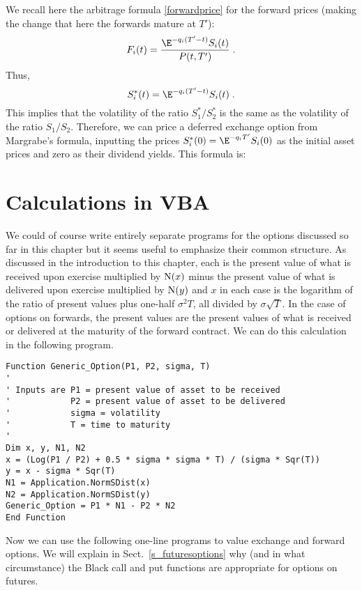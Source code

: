 We recall here the arbitrage formula \eqref{forwardprice} for the forward prices (making the change that here the forwards mature at $T'$):
$$F_i(t) =  \frac{\E^{-q_i(T'-t)}S_i(t)}{P(t,T')}\; .$$
Thus,
$$S^*_i(t) = \E^{-q_i(T'-t)}S_i(t)\; .$$
This implies that the volatility of the ratio $S_1^*/S_2^*$ is the same as the volatility of the ratio $S_1/S_2$.  Therefore, we can price a deferred exchange option from Margrabe's formula, inputting the prices $S^*_i(0) = \E^{-q_iT'}S_i(0)$ as the initial asset prices and zero as their dividend yields.  This formula is:


\section{Calculations in VBA}\label{s_matlabimplementations}

We could of course write entirely separate programs for the options discussed so far in this chapter but it seems useful to emphasize their common structure.  As discussed in the introduction to this chapter, each is the present value of what is received upon exercise multiplied by $\operatorname{N}(x)$ minus the present value of what is delivered upon exercise multiplied by $\operatorname{N}(y)$ and $x$ in each case is the logarithm of the ratio of present values plus one-half $\sigma^2T$, all divided by $\sigma\sqrt{T}$.  In the case of options on forwards, the present values are the present values of what is received or delivered at the maturity of the forward contract.  We can do this calculation in the following program.
\small\begin{verbatim}
Function Generic_Option(P1, P2, sigma, T)
'
' Inputs are P1 = present value of asset to be received
'            P2 = present value of asset to be delivered
'            sigma = volatility
'            T = time to maturity
'
Dim x, y, N1, N2
x = (Log(P1 / P2) + 0.5 * sigma * sigma * T) / (sigma * Sqr(T))
y = x - sigma * Sqr(T)
N1 = Application.NormSDist(x)
N2 = Application.NormSDist(y)
Generic_Option = P1 * N1 - P2 * N2
End Function
\end{verbatim}\normalsize
Now we can use the following one-line programs to value exchange and forward options.  We will explain in Sect.~\ref{s_futuresoptions} why (and in what circumstance) the Black call and put functions are appropriate for options on futures.

